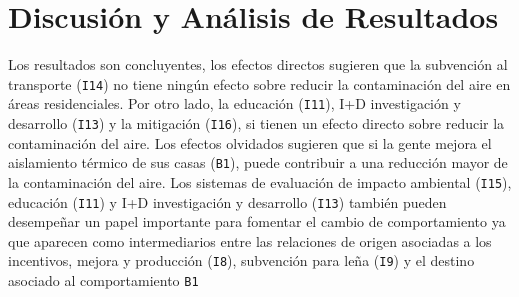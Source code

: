 \chapter{Discusión y Análisis de Resultados}

Los resultados son concluyentes, los efectos directos sugieren que la subvención al transporte (\texttt{I14}) no tiene ningún efecto sobre reducir la contaminación del aire en áreas residenciales. Por otro lado, la educación (\texttt{I11}), I+D investigación y desarrollo (\texttt{I13}) y la mitigación (\texttt{I16}), si tienen un efecto directo sobre reducir la contaminación del aire. Los efectos olvidados sugieren que si la gente mejora el aislamiento térmico de sus casas (\texttt{B1}), puede contribuir a una reducción mayor de la contaminación del aire. Los sistemas de evaluación de impacto ambiental (\texttt{I15}), educación (\texttt{I11}) y I+D investigación y desarrollo (\texttt{I13}) también pueden desempeñar un papel importante para fomentar el cambio de comportamiento ya que aparecen como intermediarios entre las relaciones de origen asociadas a los incentivos, mejora y producción (\texttt{I8}), subvención para leña (\texttt{I9}) y el destino asociado al comportamiento \texttt{B1}